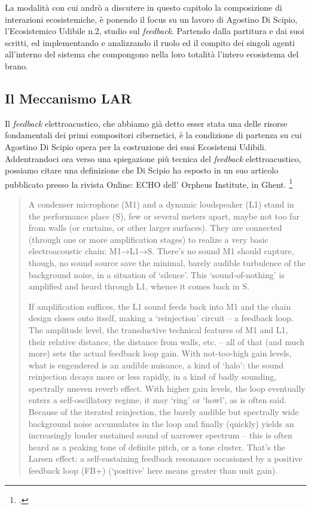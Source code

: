 La modalità con cui andrò a discutere in questo capitolo la composizione di interazioni ecosistemiche, 
è ponendo il focus su un lavoro di Agostino Di Scipio, l’Ecosistemico Udibile n.2, studio sul \emph{feedback}. 
Partendo dalla partitura e dai suoi scritti, ed implementando e analizzando
il ruolo ed il compito dei singoli agenti all'interno del sistema 
che compongono nella loro totalità l'intero ecosistema del brano. 

\subsection{Il Meccanismo LAR}
\label{sec:Il Meccanismo LAR}

Il \emph{feedback} elettroacustico, che abbiamo già detto
esser stata una delle risorse fondamentali dei primi compositori cibernetici,
è la condizione di partenza su cui Agostino Di Scipio opera per la costruzione dei suoi Ecosistemi Udibili.
Addentrandoci ora verso una spiegazione più tecnica del \emph{feedback} elettroacustico,
possiamo citare una definizione che Di Scipio ha esposto in un suo articolo
pubblicato presso la rivista Online: ECHO dell’ Orpheus Institute, in
Ghent. \footcite{di_scipio_relational_2022}

\begin{quote}
A condenser microphone (M1) and a dynamic loudspeaker (L1) stand in the performance place
(S), few or several meters apart, maybe not too far from walls (or curtains, or other larger
surfaces). They are connected (through one or more amplification stages) to realize a very
basic electroacoustic chain: M1→L1→S. There’s no sound M1 should capture, though, no sound
source save the minimal, barely audible turbulence of the background noise, in a situation of
‘silence’. This ‘sound-of-nothing’ is amplified and heard through L1, whence it comes back in
S.

If amplification suffices, the L1 sound feeds back into M1 and the chain design closes onto
itself, making a ‘reinjection’ circuit – a feedback loop. The amplitude level, the
transductive technical features of M1 and L1, their relative distance, the distance from
walls, etc. – all of that (and much more) sets the actual feedback loop gain. With
not-too-high gain levels, what is engendered is an audible nuisance, a kind of ‘halo’: the
sound reinjection decays more or less rapidly, in a kind of badly sounding, spectrally uneven
reverb effect. With higher gain levels, the loop eventually enters a self-oscillatory regime,
it may ‘ring’ or ‘howl’, as is often said. Because of the iterated reinjection, the barely
audible but spectrally wide background noise accumulates in the loop and finally (quickly)
yields an increasingly louder sustained sound of narrower spectrum – this is often heard as a
peaking tone of definite pitch, or a tone cluster. That’s the Larsen effect: a self-sustaining
feedback resonance occasioned by a positive feedback loop (FB+) (‘positive’ here means greater
than unit gain).
\end{quote}

